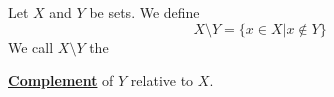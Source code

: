 \newcommand{\SetComplement}[0]{
    \textbf{\hyperref[def:SetComplement]{Complement}}
}
\newcommand{\SetComplements}[0]{
    \textbf{\hyperref[def:SetComplement]{Complements}}
}
\begin{df}
\label{def:SetComplement}

\rm
    Let $X$ and $Y$ be sets. 
    We define 
    \begin{equation*}
        X \setminus Y= \{x \in X | x \not \in Y\}
    \end{equation*}
    We call $X \setminus Y$ the 
    \SetComplement of $Y$ relative to $X$. 
\end{df}
